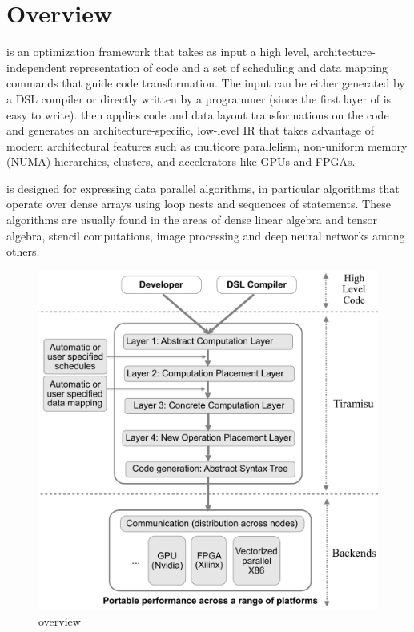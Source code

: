 \section{\framework Overview}

\framework is an optimization framework that takes as input a high level, architecture-independent representation of code and a set of scheduling and data mapping commands that guide code transformation.  The input can be either generated by a DSL compiler or directly written by a programmer (since the first layer of \framework{} is easy to write).  \framework{} then applies code and data layout transformations on the code and generates an architecture-specific, low-level IR that takes advantage of modern architectural features such as multicore parallelism, non-uniform memory (NUMA) hierarchies, clusters, and accelerators like GPUs and FPGAs.

\framework is designed for expressing data parallel algorithms, in particular algorithms that operate over dense arrays using loop nests and sequences of statements.  These algorithms are usually found in the areas of dense linear algebra and tensor algebra, stencil computations, image processing and deep neural networks among others.


\begin{figure}
 \includegraphics[scale=0.35]{./figures/fista.pdf}
 \vspace{-0.25cm}
 \caption{\framework overview}
 \label{fig:overview}
 \vspace{-0.25cm}
\end{figure}


